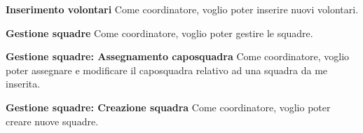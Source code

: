 \textbf{Inserimento volontari}
Come coordinatore, voglio poter inserire nuovi volontari.

\textbf{Gestione squadre}
Come coordinatore, voglio poter gestire le squadre.

\textbf{Gestione squadre: Assegnamento caposquadra}
Come coordinatore, voglio poter assegnare e modificare il caposquadra relativo ad una squadra da me inserita.

\textbf{Gestione squadre: Creazione squadra}
Come coordinatore, voglio poter creare nuove squadre.
